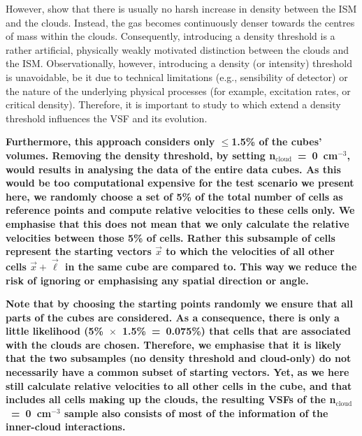 However,  show that there is usually no harsh increase in density between the ISM and the clouds. 
Instead, the gas becomes continuously denser towards the centres of mass within the clouds. 
Consequently, introducing a density threshold is a rather artificial, physically weakly motivated distinction between the clouds and the ISM.
Observationally, however, introducing a density (or intensity) threshold is unavoidable, be it due to technical limitations (e.g., sensibility of detector) or the nature of the underlying physical processes (for example, excitation rates, or critical density).
Therefore, it is important to study to which extend a density threshold influences the VSF and its evolution.

\textbf{Furthermore, this approach considers only $\leq$1.5\% of the cubes' volumes.
Removing the density threshold, by setting n$_\mathrm{cloud}$~=~0~cm$^{-3}$, would results in analysing the data of the entire data cubes.
As this would be too computational expensive for the test scenario we present here, we randomly choose a set of 5\% of the total number of cells as reference points and compute relative velocities to these cells only.
We emphasise that this does not mean that we only calculate the relative velocities between those 5\% of cells.
Rather this subsample of cells represent the starting vectors $\vec{x}$ to which the velocities of all other cells $\vec{x} + \vec{\ell}$ in the same cube are compared to.
This way we reduce the risk of ignoring or emphasising any spatial direction or angle.}

\textbf{Note that by choosing the starting points randomly we ensure that all parts of the cubes are considered. 
As a consequence, there is only a little likelihood (5\%~$\times$~1.5\%~=~0.075\%) that cells that are associated with the clouds are chosen.
Therefore, we emphasise that it is likely that the two subsamples (no density threshold and cloud-only) do not necessarily have a common subset of starting vectors.
Yet, as we here still calculate relative velocities to all other cells in the cube, and that includes all cells making up the clouds, the resulting VSFs of the n$_\mathrm{cloud}$~=~0~cm$^{-3}$ sample also consists of most of the information of the inner-cloud interactions.}

